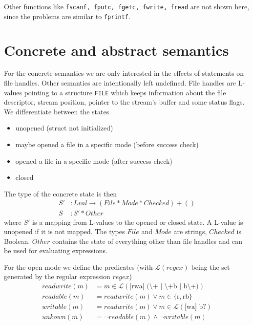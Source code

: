 Other functions like \verb|fscanf, fputc, fgetc, fwrite, fread| are not shown here, since the problems are similar to \verb|fprintf|.


\section{Concrete and abstract semantics}
For the concrete semantics we are only interested in the effects of statements on file handles. Other semantics are intentionally left undefined.
File handles are L-values pointing to a structure \verb|FILE| which keeps information about the file descriptor, stream position, pointer to the stream's buffer and some status flags.
We differentiate between the states
\begin{itemize}
\item unopened (struct not initialized)
\item maybe opened a file in a specific mode (before success check)
\item opened a file in a specific mode (after success check)
\item closed
\end{itemize}
The type of the concrete state is then
\begin{align}
S' &: \mathit{Lval} \to (\mathit{File} * \mathit{Mode} * \mathit{Checked}) + ()\\
S  &: S' * \mathit{Other}
\end{align}
where $S'$ is a mapping from L-values to the opened or closed state. A L-value is unopened if it is not mapped.
The types $\mathit{File}$ and $\mathit{Mode}$ are strings, $\mathit{Checked}$ is Boolean.
$\mathit{Other}$ contains the state of everything other than file handles and can be used for evaluating expressions.

For the open mode we define the predicates (with $\mathcal{L}(\mathit{regex})$ being the set generated by the regular expression $\mathit{regex}$)
\begin{align}
\mathit{readwrite}(m) &= m \in \mathcal{L}(\text{[rwa] (\textbackslash+ | \textbackslash+b | b\textbackslash+)})\\
\mathit{readable}(m) &= \mathit{readwrite}(m) \vee m \in \{\text{r}, \text{rb}\}\\
\mathit{writable}(m) &= \mathit{readwrite}(m) \vee m \in \mathcal{L}(\text{[wa] b?})\\
\mathit{unkown}(m) &= \neg \mathit{readable}(m) \wedge \neg \mathit{writable}(m)
\end{align}

